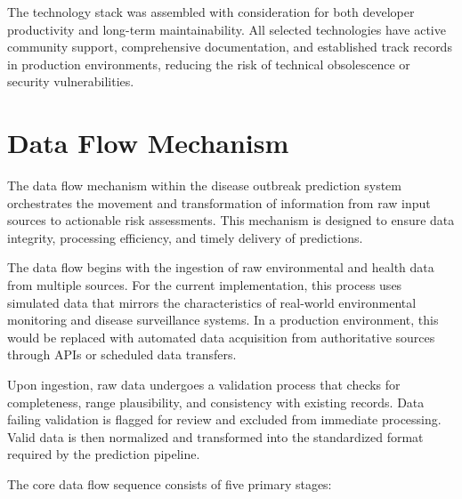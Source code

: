 \documentclass[12pt,a4paper]{report}
\begin{document}
The technology stack was assembled with consideration for both developer productivity and long-term maintainability. All selected technologies have active community support, comprehensive documentation, and established track records in production environments, reducing the risk of technical obsolescence or security vulnerabilities.

\section{Data Flow Mechanism}
The data flow mechanism within the disease outbreak prediction system orchestrates the movement and transformation of information from raw input sources to actionable risk assessments. This mechanism is designed to ensure data integrity, processing efficiency, and timely delivery of predictions.

The data flow begins with the ingestion of raw environmental and health data from multiple sources. For the current implementation, this process uses simulated data that mirrors the characteristics of real-world environmental monitoring and disease surveillance systems. In a production environment, this would be replaced with automated data acquisition from authoritative sources through APIs or scheduled data transfers.

Upon ingestion, raw data undergoes a validation process that checks for completeness, range plausibility, and consistency with existing records. Data failing validation is flagged for review and excluded from immediate processing. Valid data is then normalized and transformed into the standardized format required by the prediction pipeline.

The core data flow sequence consists of five primary stages:
\end{document}
